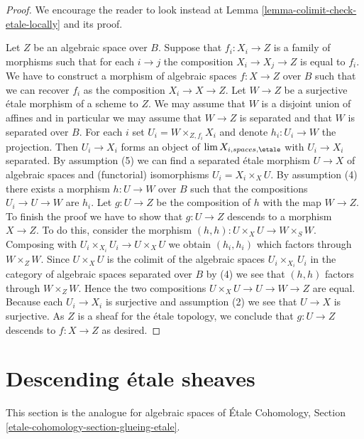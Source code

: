 \begin{proof}
We encourage the reader to look instead at
Lemma \ref{lemma-colimit-check-etale-locally}
and its proof.

\medskip\noindent
Let $Z$ be an algebraic space over $B$. Suppose that $f_i : X_i \to Z$ is
a family of morphisms such that for each $i \to j$ the composition
$X_i \to X_j \to Z$ is equal to $f_i$. We have to construct a morphism
of algebraic spaces $f : X \to Z$ over $B$ such that we can recover $f_i$ as
the composition $X_i \to X \to Z$. Let $W \to Z$ be a surjective
\'etale morphism of a scheme to $Z$. We may assume that $W$ is a
disjoint union of affines and in particular we may assume that
$W \to Z$ is separated and that $W$ is separated over $B$. For each $i$ set
$U_i = W \times_{Z, f_i} X_i$ and denote $h_i : U_i \to W$ the projection.
Then $U_i \to X_i$ forms an object of $\lim X_{i, spaces, \etale}$
with $U_i \to X_i$ separated. By
assumption (5) we can find a separated \'etale morphism $U \to X$
of algebraic spaces and (functorial) isomorphisms $U_i = X_i \times_X U$.
By assumption (4) there exists a morphism $h : U \to W$ over $B$
such that the compositions $U_i \to U \to W$ are $h_i$.
Let $g : U \to Z$ be the composition of $h$ with the map $W \to Z$. To
finish the proof we have to show that $g : U \to Z$
descends to a morphism $X \to Z$. To do this, consider the morphism
$(h, h) : U \times_X U \to W \times_S W$.
Composing with $U_i \times_{X_i} U_i \to U \times_X U$ we obtain
$(h_i, h_i)$ which factors through $W \times_Z W$. Since $U \times_X U$
is the colimit of the algebraic spaces $U_i \times_{X_i} U_i$
in the category of algebraic spaces separated over $B$ by (4) we see
that $(h, h)$ factors through $W \times_Z W$. Hence the two compositions
$U \times_X U \to U \to W \to Z$ are equal. Because each $U_i \to X_i$ is
surjective and assumption (2) we see that $U \to X$ is surjective.
As $Z$ is a sheaf for the \'etale topology, we conclude that
$g : U \to Z$ descends to $f : X \to Z$ as desired.
\end{proof}





\section{Descending \'etale sheaves}
\label{section-glueing-etale}

\noindent
This section is the analogue for algebraic spaces of
\'Etale Cohomology, Section \ref{etale-cohomology-section-glueing-etale}.

